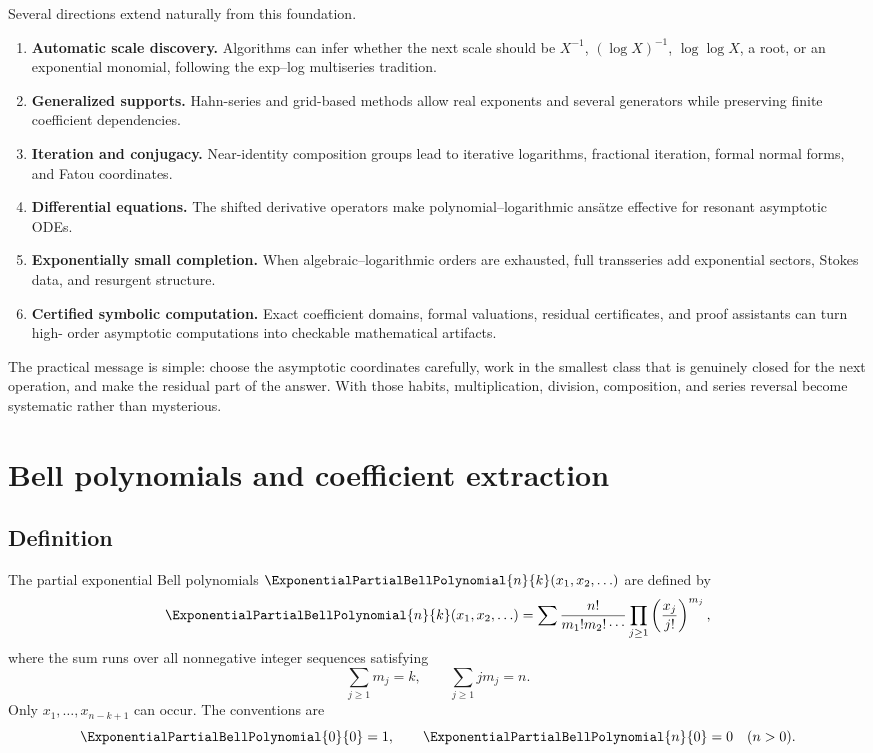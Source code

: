 \documentclass[11pt,openany]{book}
\theoremstyle{definition}
\theoremstyle{plain}
\theoremstyle{remark}
\begin{document}
Several directions extend naturally from this foundation.
\begin{enumerate}
\item \textbf{Automatic scale discovery.}  Algorithms can infer whether the
next scale should be \(X^{-1}\), \((\log X)^{-1}\), \(\log\log X\), a root, or
an exponential monomial, following the exp--log multiseries tradition.
\item \textbf{Generalized supports.}  Hahn-series and grid-based methods allow
real exponents and several generators while preserving finite coefficient
dependencies.
\item \textbf{Iteration and conjugacy.}  Near-identity composition groups lead
to iterative logarithms, fractional iteration, formal normal forms, and Fatou
coordinates.
\item \textbf{Differential equations.}  The shifted derivative operators make
polynomial--logarithmic ansätze effective for resonant asymptotic ODEs.
\item \textbf{Exponentially small completion.}  When algebraic--logarithmic
orders are exhausted, full transseries add exponential sectors, Stokes data,
and resurgent structure.
\item \textbf{Certified symbolic computation.}  Exact coefficient domains,
formal valuations, residual certificates, and proof assistants can turn high-
order asymptotic computations into checkable mathematical artifacts.
\end{enumerate}

The practical message is simple: choose the asymptotic coordinates carefully,
work in the smallest class that is genuinely closed for the next operation,
and make the residual part of the answer.  With those habits, multiplication,
division, composition, and series reversal become systematic rather than
mysterious.

\appendix

\chapter{Bell polynomials and coefficient extraction}\label{app:bell}

\section{Definition}
The partial exponential Bell polynomials
\(\ExponentialPartialBellPolynomial{n}{k}(x_1,x_2,\ldots)\) are defined by
\begin{equation}\label{eq:bell-definition}
 \ExponentialPartialBellPolynomial{n}{k}(x_1,x_2,\ldots)
 =\sum
 \frac{n!}{m_1!m_2!\cdots}
 \prod_{j\ge1}\left(\frac{x_j}{j!}\right)^{m_j},
\end{equation}
where the sum runs over all nonnegative integer sequences satisfying
\[
 \sum_{j\ge1}m_j=k,
 \qquad
 \sum_{j\ge1}jm_j=n.
\]
Only \(x_1,\ldots,x_{n-k+1}\) can occur.  The conventions are
\[
 \ExponentialPartialBellPolynomial{0}{0}=1,
 \qquad
 \ExponentialPartialBellPolynomial{n}{0}=0\quad(n>0).
\]
\end{document}
